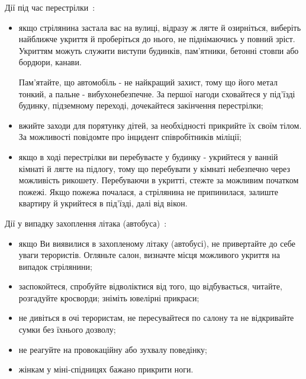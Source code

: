 Дії під час перестрілки~\cite{cherkass}:
\begin{itemize}
	\item якщо стрілянина застала вас на вулиці, відразу ж лягте й озирніться, виберіть найближче укриття й проберіться до нього, не піднімаючись у повний зріст. Укриттям можуть служити виступи будинків, пам'ятники, бетонні стовпи або бордюри, канави.

	Пам'ятайте, що автомобіль - не найкращий захист, тому що його метал тонкий, а пальне - вибухонебезпечне. За першої нагоди сховайтеся у під'їзді будинку, підземному переході, дочекайтеся закінчення перестрілки;
	
	\item вжийте заходи для порятунку дітей, за необхідності прикрийте їх своїм тілом. За можливості повідомте про інцидент співробітників міліції;
	
	\item якщо в ході перестрілки ви перебуваєте у будинку - укрийтеся у ванній кімнаті й лягте на підлогу, тому що перебувати у кімнаті небезпечно через можливість рикошету. Перебуваючи в укритті, стежте за можливим початком пожежі. Якщо пожежа почалася, а стрілянина не припинилася, залиште квартиру й укрийтеся в під'їзді, далі від вікон.
\end{itemize}

Дії у випадку захоплення літака (автобуса)~\cite{cherkass}: 
\begin{itemize}
	\item якщо Ви виявилися в захопленому літаку (автобусі), не привертайте до себе уваги терористів. Огляньте салон, визначте місця можливого укриття на випадок стрілянини;
	\item заспокойтеся, спробуйте відволіктися від того, що відбувається, читайте, розгадуйте кросворди; зніміть ювелірні прикраси;
	\item не дивіться в очі терористам, не пересувайтеся по салону та не відкривайте сумки без їхнього дозволу;
	\item не реагуйте на провокаційну або зухвалу поведінку;
	\item жінкам у міні-спідницях бажано прикрити ноги.
\end{itemize}

